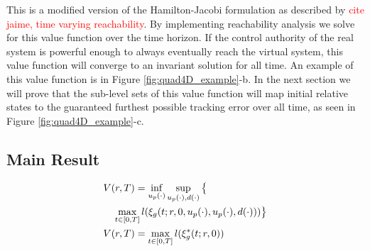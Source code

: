  This is a modified version of the Hamilton-Jacobi formulation as described by \textcolor{red}{cite jaime, time varying reachability}. By implementing reachability analysis we solve for this value function over the time horizon. If the control authority of the real system is powerful enough to always eventually reach the virtual system, this value function will converge to an invariant solution for all time.  An example of this value function is in Figure \ref{fig:quad4D_example}-b. In the next section we will prove that the sub-level sets of this value function will map initial relative states to the guaranteed furthest possible tracking error over all time, as seen in Figure \ref{fig:quad4D_example}-c.
 
\subsection{Main Result}
 \begin{equation}
 \begin{aligned}
& V(r, T) = \inf_{u_p(\cdot)} \sup_{u_p(\cdot), d(\cdot)} \big\{\\
&\quad \max_{t \in [0, T]} l(\xi_g(t; r, 0, u_p(\cdot), u_p(\cdot), d(\cdot)))\big\} \\
& V(r, T) = \max_{t \in [0, T]} l(\xi_g^*(t; r, 0)) 
 \end{aligned}
  \end{equation}
 
